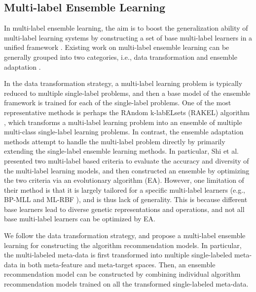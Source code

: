 \documentclass[acmsmall]{acmart}
\begin{document}



\subsection{Multi-label Ensemble Learning}


In multi-label ensemble learning, the aim is to boost the generalization ability of multi-label learning systems 
by constructing a set of base multi-label learners in a unified framework \cite{tsoumakas2007random,Gulisong2010triple,Lior2014ensemble,shi2011multi,min2014Review}.
Existing work on multi-label ensemble learning can be generally grouped into two categories, i.e., data
transformation \cite{tsoumakas2007random,Gulisong2010triple,Lior2014ensemble} and ensemble adaptation \cite{shi2011multi}. 



In the data transformation strategy, 
a multi-label learning problem is typically reduced to multiple single-label problems, 
and then a base model of the ensemble framework is trained for each of the single-label problems. 
One of the most representative methods is perhaps the RAndom k-labELsets (RAKEL) algorithm \cite{tsoumakas2007random}, 
which transforms a multi-label learning problem into an ensemble of multiple multi-class single-label learning problems. 
In contrast, 
the ensemble adaptation methods attempt to handle the multi-label problem directly
by primarily extending the single-label ensemble learning methods. 
In particular,
Shi et al. \cite{shi2011multi} presented two multi-label based criteria to evaluate the accuracy and
diversity of the multi-label learning models, 
and then constructed an ensemble by optimizing the two criteria via an evolutionary algorithm (EA). 
However, one limitation of their method is that 
it is largely tailored for a specific multi-label learners (e.g., BP-MLL \cite{zhang2006multi} and ML-RBF
\cite{zhang2009ml}), and is thus lack of generality.
This is because different base learners lead to diverse genetic representations and operations, 
and not all base multi-label learners can be optimized by EA.


We follow the data transformation strategy, 
and propose a multi-label ensemble learning for constructing the algorithm recommendation models.
In particular, 
the multi-labeled meta-data is first transformed into multiple single-labeled meta-data in
both meta-feature and meta-target spaces.
Then, an ensemble recommendation model can be constructed
by combining individual algorithm recommendation models trained on all the transformed single-labeled meta-data.
\end{document}
